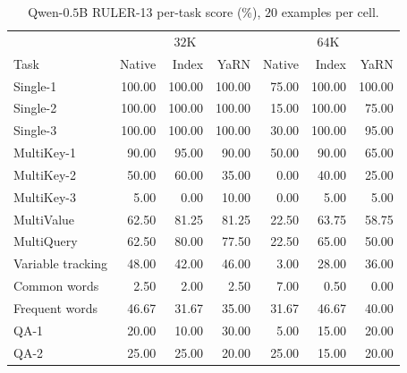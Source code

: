 \begin{table}[ht]
\centering\small
\caption{Qwen-$0.5$B RULER-13 per-task score (\%), $20$ examples per cell.}
\label{tab:index-full13}
\begin{tabular}{@{}lrrrrrr@{}}
\toprule
& \multicolumn{3}{c}{$32$K} & \multicolumn{3}{c}{$64$K}\\
Task & Native & Index & YaRN & Native & Index & YaRN\\
\midrule
Single-1 & 100.00 & 100.00 & 100.00 & 75.00 & 100.00 & 100.00 \\
Single-2 & 100.00 & 100.00 & 100.00 & 15.00 & 100.00 & 75.00 \\
Single-3 & 100.00 & 100.00 & 100.00 & 30.00 & 100.00 & 95.00 \\
MultiKey-1 & 90.00 & 95.00 & 90.00 & 50.00 & 90.00 & 65.00 \\
MultiKey-2 & 50.00 & 60.00 & 35.00 & 0.00 & 40.00 & 25.00 \\
MultiKey-3 & 5.00 & 0.00 & 10.00 & 0.00 & 5.00 & 5.00 \\
MultiValue & 62.50 & 81.25 & 81.25 & 22.50 & 63.75 & 58.75 \\
MultiQuery & 62.50 & 80.00 & 77.50 & 22.50 & 65.00 & 50.00 \\
Variable tracking & 48.00 & 42.00 & 46.00 & 3.00 & 28.00 & 36.00 \\
Common words & 2.50 & 2.00 & 2.50 & 7.00 & 0.50 & 0.00 \\
Frequent words & 46.67 & 31.67 & 35.00 & 31.67 & 46.67 & 40.00 \\
QA-1 & 20.00 & 10.00 & 30.00 & 5.00 & 15.00 & 20.00 \\
QA-2 & 25.00 & 25.00 & 20.00 & 25.00 & 15.00 & 20.00 \\
\bottomrule
\end{tabular}
\end{table}
